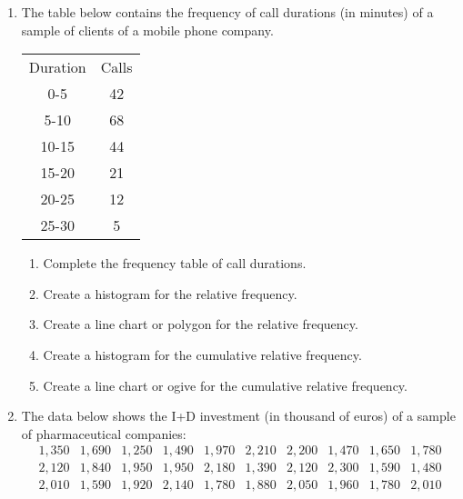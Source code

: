 \begin{enumerate}[leftmargin=*,resume]
\item The table below contains the frequency of call durations (in minutes) of a sample of clients of a mobile phone
company.
\begin{center}
\begin{tabular}{cc}
\toprule
Duration & Calls\\
0-5 & 42\\
5-10 & 68\\
10-15 & 44\\
15-20 & 21\\
20-25 & 12\\
25-30 & 5\\
\bottomrule
\end{tabular}
\end{center}
\begin{enumerate}
\item Complete the frequency table of call durations. 
\item Create a histogram for the relative frequency.
\item Create a line chart or polygon for the relative frequency. 
\item Create a histogram for the cumulative relative frequency. 
\item Create a line chart or ogive for the cumulative relative frequency. 
\end{enumerate}


\item The data below shows the I+D investment (in thousand of euros) of a sample of pharmaceutical companies:
\[
\begin{array}{rrrrrrrrrr}
1,350 & 1,690 & 1,250 & 1,490 & 1,970 & 2,210 & 2,200 & 1,470 & 1,650 & 1,780 \\
2,120 & 1,840 & 1,950 & 1,950 & 2,180 & 1,390 & 2,120 & 2,300 & 1,590 & 1,480 \\
2,010 & 1,590 & 1,920 & 2,140 & 1,780 & 1,880 & 2,050 & 1,960 & 1,780 & 2,010 
\end{array}
\]


\end{enumerate}
